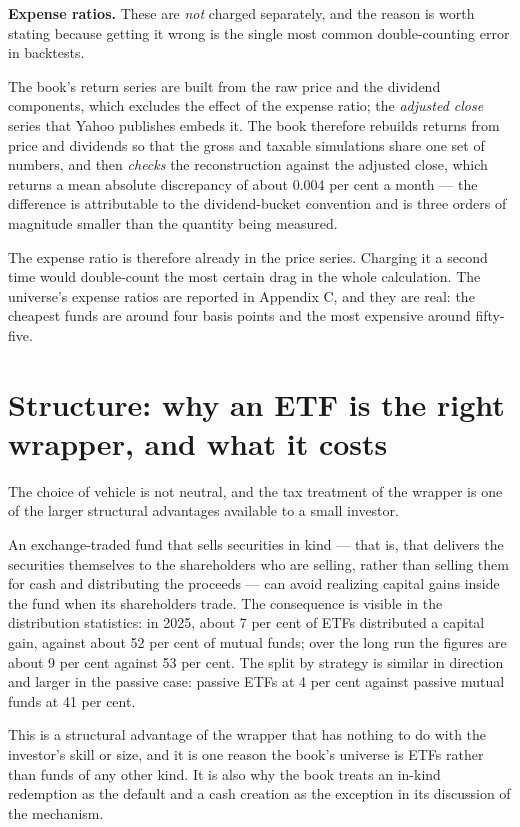 \textbf{Expense ratios.} These are \emph{not} charged separately, and the
reason is worth stating because getting it wrong is the single most
common double-counting error in backtests.

The book's return series are built from the raw price and the dividend
components, which excludes the effect of the expense ratio; the
\emph{adjusted close} series that Yahoo publishes embeds it. The book
therefore rebuilds returns from price and dividends so that the gross and
taxable simulations share one set of numbers, and then \emph{checks} the
reconstruction against the adjusted close, which returns a mean absolute
discrepancy of about 0.004 per cent a month --- the difference is
attributable to the dividend-bucket convention and is three orders of
magnitude smaller than the quantity being measured.

The expense ratio is therefore already in the price series. Charging it a
second time would double-count the most certain drag in the whole
calculation. The universe's expense ratios are reported in Appendix C, and
they are real: the cheapest funds are around four basis points and the
most expensive around fifty-five.

\section{Structure: why an ETF is the right wrapper, and what it costs}

The choice of vehicle is not neutral, and the tax treatment of the wrapper
is one of the larger structural advantages available to a small investor.

An exchange-traded fund that sells securities in kind --- that is, that
delivers the securities themselves to the shareholders who are selling,
rather than selling them for cash and distributing the proceeds --- can
avoid realizing capital gains inside the fund when its shareholders trade.
The consequence is visible in the distribution statistics: in 2025, about
7 per cent of ETFs distributed a capital gain, against about 52 per cent
of mutual funds; over the long run the figures are about 9 per cent against
53 per cent. The split by strategy is similar in direction and larger in
the passive case: passive ETFs at 4 per cent against passive mutual funds
at 41 per cent.

This is a structural advantage of the wrapper that has nothing to do with
the investor's skill or size, and it is one reason the book's universe is
ETFs rather than funds of any other kind. It is also why the book treats
an in-kind redemption as the default and a cash creation as the exception
in its discussion of the mechanism.

